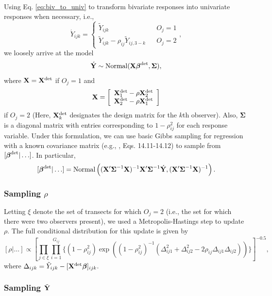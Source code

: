 \documentclass[10pt]{article}
\begin{document}
Using Eq. \ref{eq:biv_to_univ} to transform bivariate responses into univariate responses when necessary, i.e.,
$$
\acute{Y}_{ijk}=
    \left\{ \begin{array}{lll}
				\tilde{Y}_{ijk} & & O_j=1\\
			    \tilde{Y}_{ijk}-\rho_{ij}\tilde{Y}_{ij,3-k} & & O_j=2
		\end{array}, \right.
$$
we loosely arrive at the model
$$
\acute{{\bf Y}} \sim {\rm Normal}({\bf X} \boldsymbol{\beta}^{\rm det},\boldsymbol{\Sigma}),
$$
where ${\bf X}={\bf X}^{\rm det}$ if $O_j=1$ and
$$
{\bf X}=\left[ \begin{array}{l}
    {\bf X}_1^{\rm det} - \rho {\bf X}_2^{\rm det} \\
    {\bf X}_2^{\rm det} - \rho {\bf X}_1^{\rm det}
    \end{array}
    \right]
$$
if $O_j=2$ (Here, ${\bf X}_k^{\rm det}$ designates the design matrix for the $k$th observer).
Also, $\boldsymbol{\Sigma}$ is a diagonal matrix with entries corresponding to $1-\rho_{ij}^2$ for each response variable.  Under this formulation, we can use basic Gibbs sampling for regression with a known covariance matrix (e.g., \cite{GelmanEtAl2004}, Eqs. 14.11-14.12) to sample from $[\boldsymbol{\beta}^{\rm det}|\hdots]$.  In particular,
$$
[\boldsymbol{\beta}^{\rm det}|\hdots]=\textrm{Normal}\left( ({\bf X}^\prime \boldsymbol{\Sigma}^{-1} {\bf X})^{-1}{\bf X}^\prime \boldsymbol{\Sigma}^{-1} \acute{{\bf Y}},
({\bf X}^\prime \boldsymbol{\Sigma}^{-1} {\bf X})^{-1} \right).
$$



\subsubsection*{Sampling $\rho$}

Letting $\xi$ denote the set of transects for which $O_j=2$ (i.e., the set for which there were two observers present), we used a Metropolis-Hastings step to update $\rho$.  The full conditional distribution for this update is given by
$$
  [\rho|\hdots] \propto \left[ \prod_{j \in \xi} \prod_{i=1}^{G_{ij}}
  \{
(1-\rho_{ij}^2)\exp\left(
(1-\rho_{ij}^2)^{-1} (\Delta_{ij1}^2+\Delta_{ij2}^2-2\rho_{ij}\Delta_{ij1}\Delta_{ij2})
  \right)
  \}
  \right]^{-0.5},
$$
where $\Delta_{ijk}=\tilde{Y}_{ijk}-[{\bf X}^{\rm det} \boldsymbol{\beta}]_{ijk}$.

\subsubsection*{Sampling $\tilde{\bf Y}$}
\end{document}
